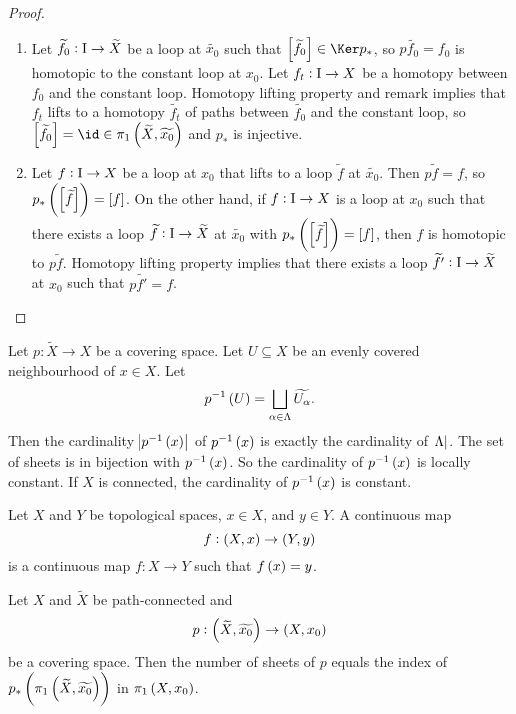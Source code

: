 \begin{proof}
\hfill
\begin{enumerate}
\item Let $ \widetilde{f_0} : \mathrm{I} \to \widetilde{X} $ be a loop at $ \widetilde{x_0} $ such that $ \sbr{\widetilde{f_0}} \in \Ker p_* $, so $ p\widetilde{f_0} = f_0 $ is homotopic to the constant loop at $ x_0 $. Let $ f_t : \mathrm{I} \to X $ be a homotopy between $ f_0 $ and the constant loop. Homotopy lifting property and remark implies that $ f_t $ lifts to a homotopy $ \widetilde{f_t} $ of paths between $ \widetilde{f_0} $ and the constant loop, so $ \sbr{\widetilde{f_0}} = \id \in \pi_1\br{\widetilde{X}, \widetilde{x_0}} $ and $ p_* $ is injective.
\item Let $ f : \mathrm{I} \to X $ be a loop at $ x_0 $ that lifts to a loop $ \widetilde{f} $ at $ \widetilde{x_0} $. Then $ p\widetilde{f} = f $, so $ p_*\br{\sbr{\widetilde{f}}} = \sbr{f} $. On the other hand, if $ f : \mathrm{I} \to X $ is a loop at $ x_0 $ such that there exists a loop $ \widetilde{f} : \mathrm{I} \to \widetilde{X} $ at $ \widetilde{x_0} $ with $ p_*\br{\sbr{\widetilde{f}}} = \sbr{f} $, then $ f $ is homotopic to $ p\widetilde{f} $. Homotopy lifting property implies that there exists a loop $ \widetilde{f'} : \mathrm{I} \to \widetilde{X} $ at $ x_0 $ such that $ p\widetilde{f'} = f $.
\end{enumerate}
\end{proof}


Let $ p : \widetilde{X} \to X $ be a covering space. Let $ U \subseteq X $ be an evenly covered neighbourhood of $ x \in X $. Let
$$ p^{-1}\br{U} = \bigsqcup_{\alpha \in \Lambda} \widetilde{U_\alpha}. $$
Then the cardinality $ \abs{p^{-1}\br{x}} $ of $ p^{-1}\br{x} $ is exactly the cardinality of $ \abs{\Lambda} $. The set of sheets is in bijection with $ p^{-1}\br{x} $. So the cardinality of $ p^{-1}\br{x} $ is locally constant. If $ X $ is connected, the cardinality of $ p^{-1}\br{x} $ is constant.

\begin{notation*}
Let $ X $ and $ Y $ be topological spaces, $ x \in X $, and $ y \in Y $. A continuous map
$$ f : \br{X, x} \to \br{Y, y} $$
is a continuous map $ f : X \to Y $ such that $ f\br{x} = y $.
\end{notation*}

\begin{proposition}
Let $ X $ and $ \widetilde{X} $ be path-connected and
$$ p : \br{\widetilde{X}, \widetilde{x_0}} \to \br{X, x_0} $$
be a covering space. Then the number of sheets of $ p $ equals the index of $ p_*\br{\pi_1\br{\widetilde{X}, \widetilde{x_0}}} $ in $ \pi_1\br{X, x_0} $.
\end{proposition}

